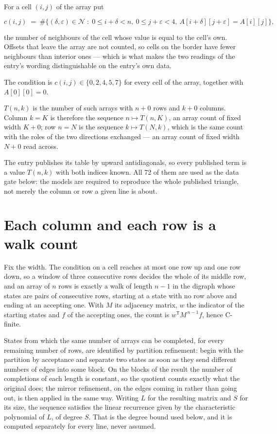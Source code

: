 \documentclass[11pt]{article}
\theoremstyle{definition}
\begin{document}
For a cell $(i,j)$ of the array put

\[c(i,j) \;=\; \#\bigl\{(\delta,\varepsilon)\in\mathcal{N} \;:\; 0\le i+\delta<n,\ 0\le j+\varepsilon<4,\ A[i+\delta][j+\varepsilon] = A[i][j]\bigr\},\]

the number of neighbours of the cell whose value is equal to the cell's own. Offsets that leave the array are not counted, so cells on the border have fewer neighbours than interior ones --- which is what makes the two readings of the entry's wording distinguishable on the entry's own data.

The condition is $c(i,j) \in \{0, 2, 4, 5, 7\}$ for every cell of the array, together with $A[0][0]=0$.

$T(n,k)$ is the number of such arrays with $n + 0$ rows and $k + 0$ columns. Column $k = K$ is therefore the sequence $n \mapsto T(n,K)$, an array count of fixed width $K + 0$; row $n = N$ is the sequence $k \mapsto T(N,k)$, which is the same count with the roles of the two directions exchanged --- an array count of fixed width $N + 0$ read across.

The entry publishes its table by upward antidiagonals, so every published term is a value $T(n,k)$ with both indices known. All 72 of them are used as the data gate below: the models are required to reproduce the whole published triangle, not merely the column or row a given line is about.

\section{Each column and each row is a walk count}

Fix the width. The condition on a cell reaches at most one row up and one row down, so a window of three consecutive rows decides the whole of its middle row, and an array of $n$ rows is exactly a walk of length $n-1$ in the digraph whose states are pairs of consecutive rows, starting at a state with no row above and ending at an accepting one. With $M$ its adjacency matrix, $w$ the indicator of the starting states and $f$ of the accepting ones, the count is $w^{\mathsf T}M^{\,n-1}f$, hence C-finite.

States from which the same number of arrays can be completed, for every remaining number of rows, are identified by partition refinement: begin with the partition by acceptance and separate two states as soon as they send different numbers of edges into some block. On the blocks of the result the number of completions of each length is constant, so the quotient counts exactly what the original does; the mirror refinement, on the edges coming in rather than going out, is then applied in the same way. Writing $L$ for the resulting matrix and $S$ for its size, the sequence satisfies the linear recurrence given by the characteristic polynomial of $L$, of degree $S$. That is the degree bound used below, and it is computed separately for every line, never assumed.
\end{document}
